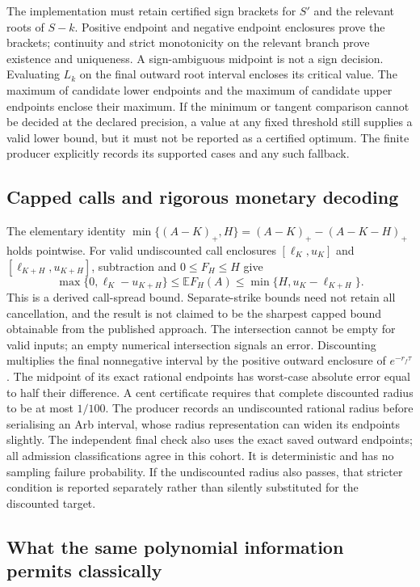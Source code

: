 The implementation must retain certified sign brackets for $S'$ and the
relevant roots of $S-k$. Positive endpoint and negative endpoint enclosures
prove the brackets; continuity and strict monotonicity on the relevant
branch prove existence and uniqueness. A sign-ambiguous midpoint is not
a sign decision. Evaluating $L_k$ on the final outward root interval
encloses its critical value. The maximum of candidate lower endpoints
and the maximum of candidate upper endpoints enclose their maximum.
If the minimum or tangent comparison cannot be decided at the declared
precision, a value at any fixed threshold still supplies a valid lower
bound, but it must not be reported as a certified optimum. The finite
producer explicitly records its supported cases and any such fallback.

\subsection{Capped calls and rigorous monetary decoding}

The elementary identity
$\min\{(A-K)_+,H\}=(A-K)_+-(A-K-H)_+$ holds pointwise.
For valid undiscounted call enclosures
$[\ell_K,u_K]$ and $[\ell_{K+H},u_{K+H}]$, subtraction and
$0\leq F_H\leq H$ give
\[
 \max\{0,\ell_K-u_{K+H}\}\leq\mathbb E F_H(A)
 \leq\min\{H,u_K-\ell_{K+H}\}.
\]
This is a derived call-spread bound. Separate-strike bounds need not retain
all cancellation, and the result is not claimed to be the sharpest capped
bound obtainable from the published approach. The intersection cannot be
empty for valid inputs; an empty numerical intersection signals an error.
Discounting multiplies the final nonnegative interval by the positive
outward enclosure of $e^{-r_f\tau}$. The midpoint of its exact rational
endpoints has worst-case absolute error equal to half their difference.
A cent certificate requires that complete discounted radius to be at most
$1/100$. The producer records an undiscounted rational radius before
serialising an Arb interval, whose radius representation can widen its
endpoints slightly. The independent final check also uses the exact saved
outward endpoints; all admission classifications agree in this cohort. It is deterministic and has no sampling failure probability.
If the undiscounted radius also passes, that stricter condition is reported
separately rather than silently substituted for the discounted target.

\subsection{What the same polynomial information permits classically}

